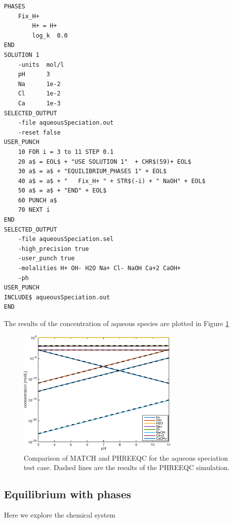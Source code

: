 \documentclass{article}
\begin{document}
\begin{Verbatim}[frame=single,fontsize=\footnotesize]
PHASES
	Fix_H+
		H+ = H+
		log_k  0.0
END
SOLUTION 1
	-units	mol/l
	pH		3
	Na 		1e-2
	Cl 		1e-2
	Ca 		1e-3 
SELECTED_OUTPUT
    -file aqueousSpeciation.out
    -reset false
USER_PUNCH
	10 FOR i = 3 to 11 STEP 0.1
	20 a$ = EOL$ + "USE SOLUTION 1"  + CHR$(59)+ EOL$
	30 a$ = a$ + "EQUILIBRIUM_PHASES 1" + EOL$
	40 a$ = a$ + "   Fix_H+ " + STR$(-i) + " NaOH" + EOL$
	50 a$ = a$ + "END" + EOL$
	60 PUNCH a$
	70 NEXT i
END
SELECTED_OUTPUT
	-file aqueousSpeciation.sel
	-high_precision true
	-user_punch true
	-molalities H+ OH- H2O Na+ Cl- NaOH Ca+2 CaOH+
	-ph
USER_PUNCH
INCLUDE$ aqueousSpeciation.out
END
\end{Verbatim}

The results of the concentration of aqueous species are plotted in Figure \ref{fig:aqueous}
\begin{figure}[H]
    \centering
    \includegraphics[width=0.7\textwidth]{aqueousSpeciation.pdf}
    \caption{Comparison of MATCH and PHREEQC for the aqueous speciation test case. Dashed lines are the results of the PHREEQC simulation.}
    \label{fig:aqueous}
\end{figure}


\subsection{Equilibrium with phases}
Here we explore the chemical system
\end{document}
